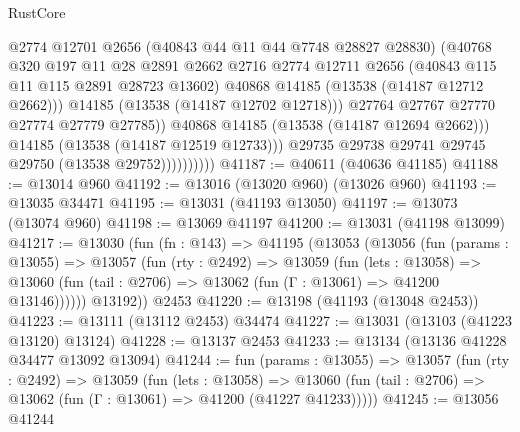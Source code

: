 \begin{lexlean}{RustCore}
\begin{coremodule}
                                @2774
                                @12701
                                @2656
                                (@40843 @44 @11 @44 @7748 @28827 @28830)
                                (@40768
                                  @320
                                  @197
                                  @11
                                  @28
                                  @2891
                                  @2662
                                  @2716
                                  @2774
                                  @12711
                                  @2656
                                  (@40843 @115 @11 @115 @2891 @28723 @13602)
                                  @40868
                                  @14185
                                  (@13538 (@14187 @12712 @2662)))
                                @14185
                                (@13538 (@14187 @12702 @12718)))
                              @27764
                              @27767
                              @27770
                              @27774
                              @27779
                              @27785))
                          @40868
                          @14185
                          (@13538 (@14187 @12694 @2662)))
                        @14185
                        (@13538 (@14187 @12519 @12733)))
                      @29735
                      @29738
                      @29741
                      @29745
                      @29750
                      (@13538 @29752))))))))))
@41187 := @40611 (@40636 @41185)
@41188 := @13014 @960
@41192 := @13016 (@13020 @960) (@13026 @960)
@41193 := @13035 @34471
@41195 := @13031 (@41193 @13050)
@41197 := @13073 (@13074 @960)
@41198 := @13069 @41197
@41200 := @13031 (@41198 @13099)
@41217 := @13030
    (fun (fn : @143) =>
    @41195
      (@13053
        (@13056
          (fun (params : @13055) =>
          @13057
            (fun (rty : @2492) =>
            @13059
              (fun (lets : @13058) =>
              @13060 (fun (tail : @2706) => @13062 (fun (Γ : @13061) => @41200 @13146))))))
        @13192))
    @2453
@41220 := @13198 (@41193 (@13048 @2453))
@41223 := @13111 (@13112 @2453) @34474
@41227 := @13031 (@13103 (@41223 @13120) @13124)
@41228 := @13137 @2453
@41233 := @13134 (@13136 @41228 @34477 @13092 @13094)
@41244 := fun (params : @13055) =>
  @13057
    (fun (rty : @2492) =>
    @13059
      (fun (lets : @13058) =>
      @13060 (fun (tail : @2706) => @13062 (fun (Γ : @13061) => @41200 (@41227 @41233)))))
@41245 := @13056 @41244

\end{coremodule}
\end{lexlean}
